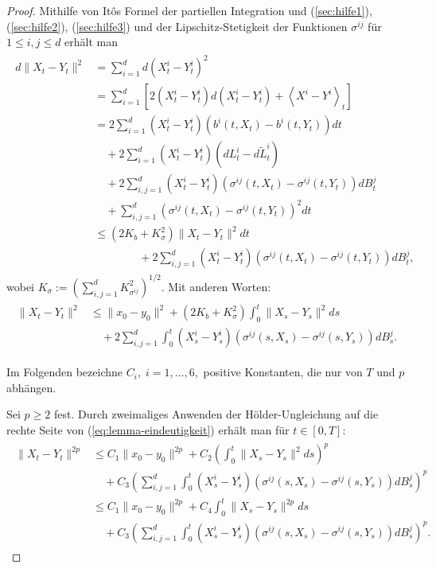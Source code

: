 \documentclass[10pt, a4paper, leqno, twoside, bibliography=totocnumbered, final]{scrartcl}
\theoremstyle{definition}
\theoremstyle{plain}%
\theoremstyle{remark}
\DeclareRobustCommand{\qvar}[1]{\ensuremath{\left\langle {#1} \right\rangle}}
\begin{document}
\begin{proof}
Mithilfe von It\^{o}s Formel der partiellen Integration und (\ref{sec:hilfe1}), (\ref{sec:hilfe2}), (\ref{sec:hilfe3}) und der Lipschitz-Stetigkeit der Funktionen $ \sigma^{ij} $ für $ 1 \leq i,j \leq d  $ erhält man
\begin{align*}
\begin{split}
 d \| X_t  - Y_t \|^2 & = \sum_{i = 1}^d d ( X^i_t - Y^i_t )^2 \\
 &  = \sum_{i = 1}^d \left[ 2 ( X^i_t - Y^i_t ) d ( X^i_t - Y^i_t ) +  \qvar{X^i - Y^i}_t \right] \\
&  = 2 \sum_{i = 1}^d ( X^i_t - Y^i_t ) \left( b^i(t,X_t) - b^i(t, Y_t) \right) dt \\
& \quad + 2 \sum_{i = 1}^d ( X^i_t - Y^i_t ) (dL^i_t - d \tilde{L}^i_t) \\
& \quad + 2 \sum_{i,j = 1}^d ( X^i_t - Y^i_t ) \left( \sigma^{ij}(t,X_t) - \sigma^{ij}(t,Y_t) \right) dB^j_t \\
& \quad + \sum_{i,j = 1}^d \left( \sigma^{ij}(t,X_t) - \sigma^{ij}(t,Y_t) \right)^2 dt \\
& \leq ( 2  K_b + K_{\sigma}^2 ) \| X_t - Y_t \|^2 dt \\
& \qquad \qquad + 2 \sum_{i,j = 1}^d ( X^i_t - Y^i_t ) \left( \sigma^{ij}(t,X_t) - \sigma^{ij}(t,Y_t) \right) dB^j_t,
\end{split}
\end{align*}
wobei $ K_{\sigma} := \left( \sum_{i,j=1}^d K_{\sigma^{ij}}^2 \right)^{1/2} $. Mit anderen Worten:
\begin{align}
\label{eq:lemma-eindeutigkeit}
\begin{split}
\| X_t - Y_t \|^2 & \leq \| x_0 - y_0 \|^2 + (2 K_b + K_{\sigma}^2) \int_0^t \| X_s - Y_s \|^2 ds \\
& \quad + 2 \sum_{i,j = 1}^d \int_0^t ( X^i_s - Y^i_s ) \left( \sigma^{ij}(s,X_s) - \sigma^{ij}(s,Y_s) \right) dB^j_s.
\end{split}
\end{align}


Im Folgenden bezeichne $ C_i, \; i = 1, \dots , 6, $ positive Konstanten, die nur von $ T $ und $ p $ abhängen.

Sei $ p \geq 2 $ fest. Durch zweimaliges Anwenden der Hölder-Ungleichung auf die rechte Seite von (\ref{eq:lemma-eindeutigkeit}) erhält man für $ t \in [0,T] $:
\begin{align}
\label{eq:lemma-fastfertig}
\begin{split}
\| X_t - Y_t \|^{2p} & \leq C_1 \| x_0 - y_0 \|^{2p} + C_2 \left( \int_0^t \| X_s - Y_s \|^2 ds  \right)^p \\
&  \quad + C_3 \left( \sum_{i,j =1}^d \int_0^t ( X^i_s - Y^i_s ) \left( \sigma^{ij}(s,X_s) - \sigma^{ij}(s,Y_s) \right) dB^j_s  \right)^p \\
&  \leq C_1 \| x_0 - y_0 \|^{2p} + C_4 \int_0^t \| X_s - Y_s \|^{2p} ds \\
& \quad +  C_3 \left( \sum_{i,j =1}^d \int_0^t ( X^i_s - Y^i_s ) \left( \sigma^{ij}(s,X_s) - \sigma^{ij}(s,Y_s) \right) dB^j_s  \right)^p.
\end{split}
\end{align}


\end{proof}
\end{document}

